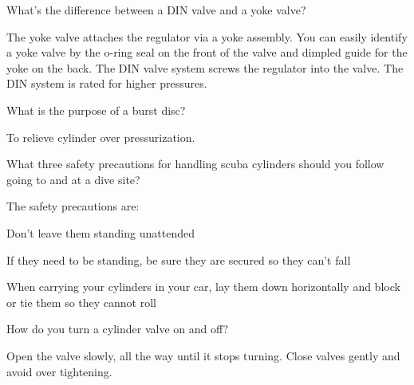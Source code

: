 	\begin{qanda}
		\begin{question}
What's the difference between a DIN valve and a yoke valve?
		\end{question}

		\begin{answer}
The yoke valve attaches the regulator via a yoke assembly.  You can easily identify a yoke valve by the o-ring seal on the front of the valve and dimpled guide for the yoke on the back.  The DIN valve system screws the regulator into the valve.  The DIN system is rated for higher pressures.
		\end{answer}
	\end{qanda}

	\begin{qanda}
		\begin{question}
What is the purpose of a burst disc?
		\end{question}

		\begin{answer}
To relieve cylinder over pressurization.
		\end{answer}
	\end{qanda}

	\begin{qanda}
		\begin{question}
What three safety precautions for handling scuba cylinders should you follow going to and at a dive site?
		\end{question}

		\begin{answer}
The safety precautions are:
			\begin{nospacebulletedlist}
				\item Don't leave them standing unattended
				\item If they need to be standing, be sure they are secured so they can't fall
				\item When carrying your cylinders in your car, lay them down horizontally and block or tie them so they cannot roll
			\end{nospacebulletedlist}
		\end{answer}
	\end{qanda}

	\begin{qanda}
		\begin{question}
How do you turn a cylinder valve on and off?
		\end{question}

		\begin{answer}
Open the valve slowly, all the way until it stops turning.  Close valves gently and avoid over tightening.
		\end{answer}
	\end{qanda}

